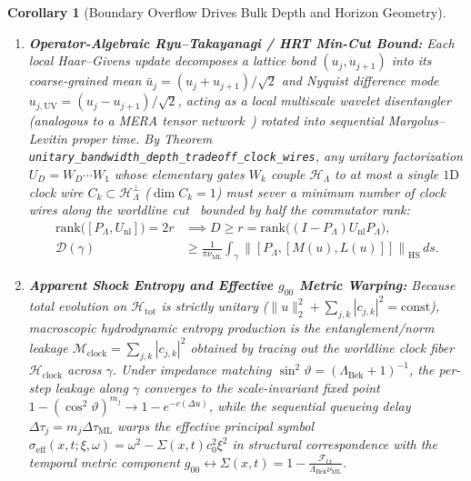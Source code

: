 \documentclass[11pt,a4paper]{article}
\newtheorem{corollary}[theorem]{Corollary}
\theoremstyle{definition}
\begin{document}
\begin{corollary}[Boundary Overflow Drives Bulk Depth and Horizon Geometry]
\begin{enumerate}
\item \textbf{Operator-Algebraic Ryu--Takayanagi / HRT Min-Cut Bound:} Each local Haar--Givens update decomposes a lattice bond $(u_j, u_{j+1})$ into its coarse-grained mean $\bar{u}_j = (u_j + u_{j+1})/\sqrt{2}$ and Nyquist difference mode $u_{j,\text{UV}} = (u_j - u_{j+1})/\sqrt{2}$, acting as a local multiscale wavelet disentangler (analogous to a MERA tensor network~\cite{swingle2012}) rotated into sequential Margolus--Levitin proper time. By Theorem \texttt{unitary\_\allowbreak{}bandwidth\_\allowbreak{}depth\_\allowbreak{}tradeoff\_\allowbreak{}clock\_\allowbreak{}wires}, any unitary factorization $U_D = W_D \cdots W_1$ whose elementary gates $W_k$ couple $\mathcal{H}_{\Lambda}$ to at most a single $1\text{D}$ clock wire $C_k \subset \mathcal{H}_{\Lambda}^{\perp}$ ($\dim C_k = 1$) must sever a minimum number of clock wires along the worldline cut~\cite{ryutakayanagi2006} bounded by half the commutator rank:
\begin{equation}
\begin{aligned}
\mathrm{rank}\!\big([P_{\Lambda}, U_{\text{nl}}]\big) = 2r &\implies D \ge r = \mathrm{rank}\!\big((I - P_{\Lambda}) U_{\text{nl}} P_{\Lambda}\big), \\[4pt]
\mathcal{D}(\gamma) &\ge \frac{1}{\pi \nu_{\text{ML}}} \int_{\gamma} \left\| [P_{\Lambda}, [M(u), L(u)]] \right\|_{\text{HS}} \, ds.
\end{aligned}
\end{equation}
\item \textbf{Apparent Shock Entropy and Effective $g_{00}$ Metric Warping:} Because total evolution on $\mathcal{H}_{\text{tot}}$ is strictly unitary ($\|u\|_2^2 + \sum_{j,k} |c_{j,k}|^2 = \mathrm{const}$), macroscopic hydrodynamic entropy production is the entanglement/norm leakage $\mathcal{M}_{\text{clock}} = \sum_{j,k} |c_{j,k}|^2$ obtained by tracing out the worldline clock fiber $\mathcal{H}_{\text{clock}}$ across $\gamma$. Under impedance matching $\sin^2\vartheta = (\Lambda_{\text{Bek}} + 1)^{-1}$, the per-step leakage along $\gamma$ converges to the scale-invariant fixed point $1 - (\cos^2\vartheta)^{m_j} \to 1 - e^{-c(\Delta u)}$, while the sequential queueing delay $\Delta\tau_j = m_j \Delta\tau_{\text{ML}}$ warps the effective principal symbol $\sigma_{\text{eff}}(x,t;\xi,\omega) = \omega^2 - \Sigma(x,t) c_0^2 \xi^2$ in structural correspondence with the temporal metric component $g_{00} \leftrightarrow \Sigma(x,t) = 1 - \frac{\mathcal{F}_{tx}}{\Lambda_{\text{Bek}}\nu_{\text{ML}}}$.
\end{enumerate}
\end{corollary}
\end{document}
